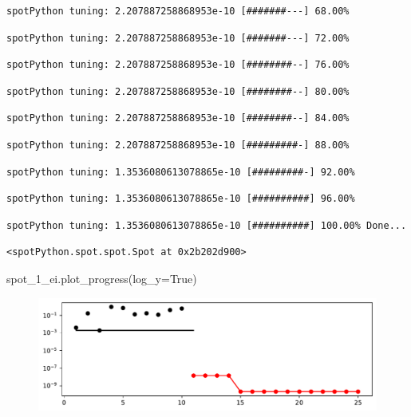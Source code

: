 \documentclass[
  letterpaper,
  DIV=11,
  numbers=noendperiod]{scrreprt}
\newenvironment{Shaded}{\begin{snugshade}}{\end{snugshade}}
\newcommand{\NormalTok}[1]{\textcolor[rgb]{0.00,0.23,0.31}{#1}}
\newcommand{\OperatorTok}[1]{\textcolor[rgb]{0.37,0.37,0.37}{#1}}
\newcommand{\VariableTok}[1]{\textcolor[rgb]{0.07,0.07,0.07}{#1}}
\begin{document}
\begin{verbatim}
spotPython tuning: 2.207887258868953e-10 [#######---] 68.00% 
\end{verbatim}

\begin{verbatim}
spotPython tuning: 2.207887258868953e-10 [#######---] 72.00% 
\end{verbatim}

\begin{verbatim}
spotPython tuning: 2.207887258868953e-10 [########--] 76.00% 
\end{verbatim}

\begin{verbatim}
spotPython tuning: 2.207887258868953e-10 [########--] 80.00% 
\end{verbatim}

\begin{verbatim}
spotPython tuning: 2.207887258868953e-10 [########--] 84.00% 
\end{verbatim}

\begin{verbatim}
spotPython tuning: 2.207887258868953e-10 [#########-] 88.00% 
\end{verbatim}

\begin{verbatim}
spotPython tuning: 1.3536080613078865e-10 [#########-] 92.00% 
\end{verbatim}

\begin{verbatim}
spotPython tuning: 1.3536080613078865e-10 [##########] 96.00% 
\end{verbatim}

\begin{verbatim}
spotPython tuning: 1.3536080613078865e-10 [##########] 100.00% Done...
\end{verbatim}

\begin{verbatim}
<spotPython.spot.spot.Spot at 0x2b202d900>
\end{verbatim}

\begin{Shaded}
\begin{Highlighting}[]
\NormalTok{spot\_1\_ei.plot\_progress(log\_y}\OperatorTok{=}\VariableTok{True}\NormalTok{)}
\end{Highlighting}
\end{Shaded}

\begin{figure}[H]

{\centering \includegraphics{07_spot_ei_files/figure-pdf/cell-11-output-1.pdf}

}

\end{figure}
\end{document}
